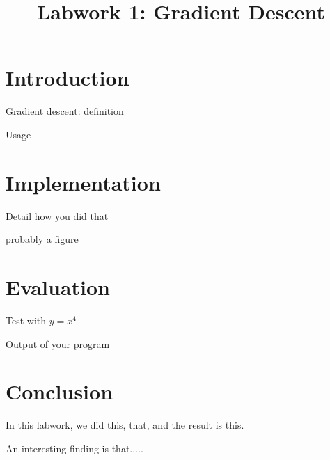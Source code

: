 \documentclass{article}
\title{Labwork 1: Gradient Descent}
\begin{document}
\maketitle

\setlength\parindent{0pt}

\section{Introduction}

Gradient descent: definition

Usage

\section{Implementation}

Detail how you did that

probably a figure 

\section{Evaluation}

Test with $y = x^4$

Output of your program

\section{Conclusion}

In this labwork, we did this, that, and the result is this.

An interesting finding is that.....
\end{document}
